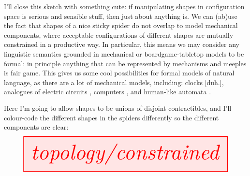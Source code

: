 I'll close this sketch with something cute: if manipulating shapes in configuration space is serious and sensible stuff, then just about anything is. We can (ab)use the fact that shapes of a nice sticky spider do not overlap to model mechanical components, where acceptable configurations of different shapes are mutually constrained in a productive way. In particular, this means we may consider any linguistic semantics grounded in mechanical or boardgame-tabletop models to be formal: in principle anything that can be represented by mechanisms and meeples is fair game. This gives us some cool possibilities for formal models of natural language, as there are a lot of mechanical models, including: clocks [duh.], analogues of electric circuits \citep{SpintronicsBuildMechanical}, computers \citep{richardridelMechanicalTuringMachine2015}, and human-like automata \citep{wikipediaauthorsJaquetDrozAutomata2022}.

\begin{example}
Here I'm going to allow shapes to be unions of disjoint contractibles, and I'll colour-code the different shapes in the spiders differently so the different components are clear:
\[\resizebox{\textwidth}{!}{\tikzfig{topology/constrained}}\]
\end{example}